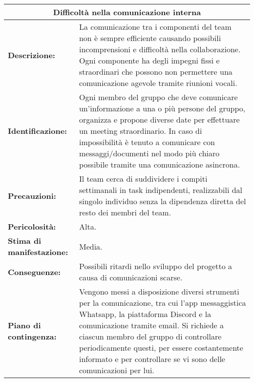 \begin{tabular}{ |p{4cm}|p{10cm}|}
\hline
\multicolumn{2}{|c|}{\textbf{Difficoltà nella comunicazione interna}} \\
\hline
\textbf{Descrizione:}& La comunicazione tra i componenti del team non è sempre efficiente causando possibili incomprensioni e difficoltà nella collaborazione. Ogni componente ha degli impegni fissi e straordinari che possono non permettere una comunicazione agevole tramite riunioni vocali.\\
\hline
\textbf{Identificazione:}& Ogni membro del gruppo che deve comunicare un'informazione a una o più persone del gruppo, organizza e propone diverse date per effettuare un meeting straordinario. In caso di impossibilità è tenuto a comunicare con messaggi/documenti nel modo più chiaro possibile tramite una comunicazione asincrona. \\
\hline
\textbf{Precauzioni:}& Il team cerca di suddividere i compiti settimanali in task indipendenti, realizzabili dal singolo individuo senza la dipendenza diretta del resto dei membri del team.\\
\hline
\textbf{Pericolosità:}& Alta.\\
\hline
\textbf{Stima di manifestazione:}& Media.\\
\hline
\textbf{Conseguenze:}& Possibili ritardi nello sviluppo del progetto a causa di comunicazioni scarse.\\
\hline
\textbf{Piano di contingenza:}& Vengono messi a disposizione diversi strumenti per la comunicazione, tra cui l'app messaggistica Whatsapp, la piattaforma Discord e la comunicazione tramite email. Si richiede  a ciascun membro del gruppo di controllare periodicamente questi, per essere costantemente informato e per controllare se vi sono delle comunicazioni per lui.\\
\hline
\end{tabular}

\vspace{20pt}

